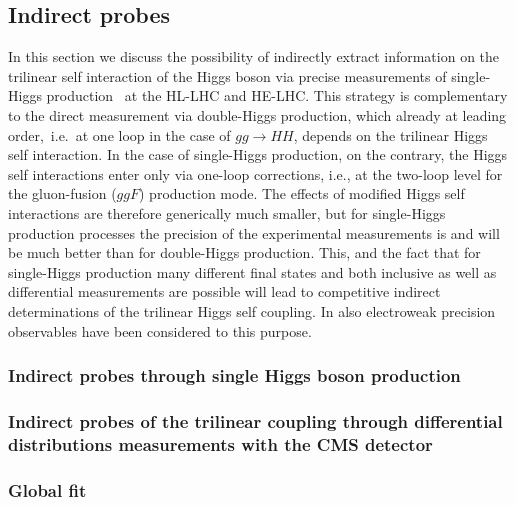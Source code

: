 \documentclass[../report.tex]{subfiles}
\providecommand{\main}{..}
\begin{document}


\subsection{Indirect probes}
\label{sec:HH_indirect}

In this section we discuss the possibility of indirectly extract information on the trilinear self interaction of the Higgs boson via precise measurements of single-Higgs production~\cite{McCullough:2013rea,Gorbahn:2016uoy,Degrassi:2016wml,Bizon:2016wgr,DiVita:2017eyz,Barklow:2017awn,Maltoni:2017ims,DiVita:2017vrr,Maltoni:2018ttu} at the HL-LHC and HE-LHC. This strategy is complementary to the direct measurement via double-Higgs production, which already at leading order,~i.e.~at one loop in the case of $gg \to HH$, depends on the trilinear Higgs self interaction. In the case of single-Higgs production, on the contrary, the Higgs self interactions enter only via one-loop corrections, i.e., at the two-loop level for the gluon-fusion ($ggF$) production mode. The effects of modified Higgs self interactions are therefore generically much smaller, but for single-Higgs production processes the precision of the experimental measurements is and will be much better than for double-Higgs production. This, and the fact that for single-Higgs production many different final states and both inclusive as well as  differential measurements are possible will lead to competitive indirect determinations of the trilinear Higgs self coupling. In \cite{Degrassi:2017ucl,Kribs:2017znd} also electroweak precision observables have been considered to this purpose.

\subsubsection{Indirect probes through single Higgs boson production}



\subsubsection{Indirect probes of the trilinear coupling through differential distributions measurements with the CMS detector}
\label{sec:CMS_HH_indirect}




\subsubsection{Global fit}
\label{sec:HH_Global_fit}

\end{document}
